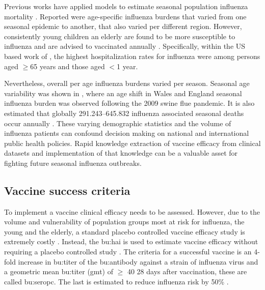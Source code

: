 Previous works have applied models to estimate seasonal population influenza mortality \citep{zhouHospitalizationsAssociatedInfluenza2012, greenMortalityAttributableInfluenza2013, iulianoEstimatesGlobalSeasonal2018}.
Reported were age-specific influenza burdens that varied from one seasonal epidemic to another, that also varied per different region.
However, consistently young children an elderly are found to be more susceptible to influenza and are advised to vaccinated annually \citep{zhouHospitalizationsAssociatedInfluenza2012}.  Specifically, within the US based work of \cite{zhouHospitalizationsAssociatedInfluenza2012}, the highest hospitalization rates for influenza were among persons aged $\geq$65 years and those aged $<$1 year.

Nevertheless, overall per age influenza burdens varied per season.
Seasonal age variability was shown in \cite{greenMortalityAttributableInfluenza2013}, where an age shift in Wales and England seasonal influenza burden was observed following the 2009 swine flue pandemic.
It is also estimated that globally 291.243–645.832 influenza associated seasonal deaths occur annually \citep{iulianoEstimatesGlobalSeasonal2018}.
These varying demographic statistics and the volume of influenza patients can confound decision making on national and international public health policies.
Rapid knowledge extraction of vaccine efficacy from clinical datasets and implementation of that knowledge can be a valuable asset for fighting future seasonal influenza outbreaks.

\subsection{Vaccine success criteria}

To implement a vaccine clinical efficacy needs to be assessed.
However, due to the volume and vulnerability of population groups most at risk for influenza, the young and the elderly, a standard placebo controlled vaccine efficacy study is extremely costly \citep{zhouHospitalizationsAssociatedInfluenza2012}.
Instead, the \gls{bu:hai} is used to estimate vaccine efficacy without requiring a placebo controlled study \citep{dejongHaemagglutinationinhibitingAntibodyInfluenza2003}.
The criteria for a successful vaccine is an 4-fold increase in \gls{bu:titer} of the \gls{bu:antibody} against a strain of influenza virus and a geometric mean \gls{bu:titer} (\acrshort{gmt}) of $\geq$ 40 28 days after vaccination, these are called \gls{bu:seropc}.
The last is estimated to reduce influenza risk by 50\% \citep{dejongHaemagglutinationinhibitingAntibodyInfluenza2003}.

